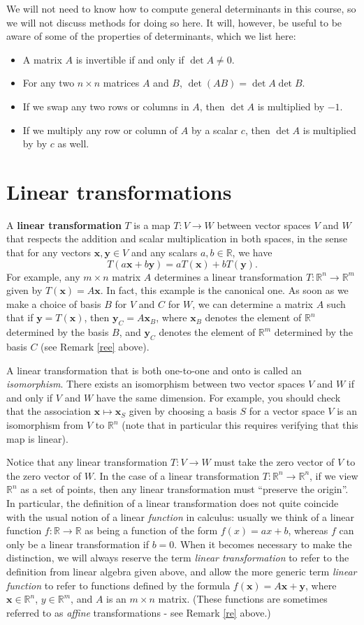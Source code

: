 \documentclass[12pt,letterpaper]{article}
\newcommand{\R}{\mathbb{R}}
\newcommand{\x}{\mathbf{x}}
\newcommand{\y}{\mathbf{y}}
\begin{document}
We will not need to know how to compute general determinants in this course, so we will not discuss methods for doing so here. It will, however, be useful to be aware of some of the properties of determinants, which we list here:
\begin{itemize}
\item A matrix $A$ is invertible if and only if $\det A\neq 0$.
\item For any two $n\times n$ matrices $A$ and $B$, $\det(AB) = \det A\det B$.
\item If we swap any two rows or columns in $A$, then $\det A$ is multiplied by $-1$.
\item If we multiply any row or column of $A$ by a scalar $c$, then $\det A$ is multiplied by by $c$ as well.
\end{itemize}
\section{Linear transformations}
A {\bf linear transformation} $T$ is a map $T:V\to W$ between vector spaces $V$ and $W$ that respects the addition and scalar multiplication in both spaces, in the sense that for any vectors $\x,\y\in V$ and any scalars $a,b\in \R$, we have
\[
T(a\x+b\y) = aT(\x)+bT(\y).
\]
For example, any $m\times n$ matrix $A$ determines a linear transformation $T:\R^n\to \R^m$ given by $T(\x) = A\x$. In fact, this example is the canonical one. As soon as we make a choice of basis $B$ for $V$ and $C$ for $W$, we can determine a matrix $A$ such that if $\y=T(\x)$, then $\y_C = A\x_B$, where $\x_B$ denotes the element of $\R^n$ determined by the basis $B$, and $\y_C$ denotes the element of $\R^m$ determined by the basis $C$ (see Remark \ref{ree} above).

A linear transformation that is both one-to-one and onto is called an {\em isomorphism}. There exists an isomorphism between two vector spaces $V$ and $W$ if and only if $V$ and $W$ have the same dimension. For example, you should check that the association $\x\mapsto \x_S$ given by choosing a basis $S$ for a vector space $V$ is an isomorphism from $V$ to $\R^n$ (note that in particular this requires verifying that this map is linear).

Notice that any linear transformation $T:V\to W$ must take the zero vector of $V$ to the zero vector of $W$. In the case of a linear transformation $T:\R^n\to \R^n$, if we view $\R^n$ as a set of points, then any linear transformation must ``preserve the origin''. In particular, the definition of a linear transformation does not quite coincide with the usual notion of a linear {\em function} in calculus: usually we think of a linear function $f:\R\to \R$ as being a function of the form $f(x) = ax+b$, whereas $f$ can only be a linear transformation if $b=0$. When it becomes necessary to make the distinction, we will always reserve the term {\em linear transformation} to refer to the definition from linear algebra given above, and allow the more generic term {\em linear function} to refer to functions defined by the formula $f(\x) = A\x+\y$, where $\x\in\R^n$, $y\in\R^m$, and $A$ is an $m\times n$ matrix. (These functions are sometimes referred to as {\em affine} transformations - see Remark \ref{re} above.)
\end{document}
